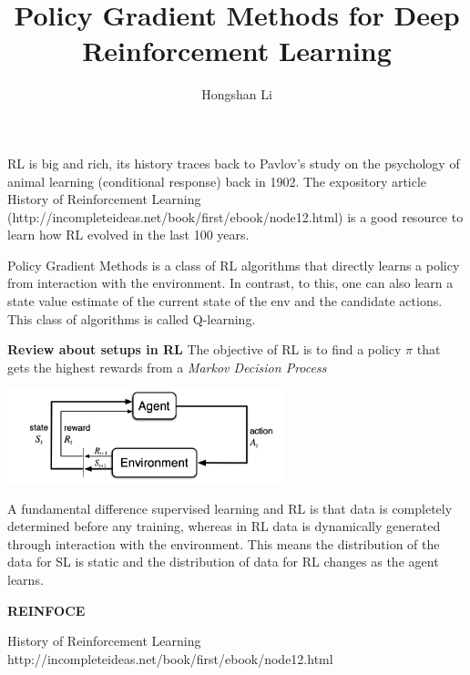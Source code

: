 \documentclass{article}
\title{Policy Gradient Methods for Deep Reinforcement Learning}
\author{Hongshan Li}
\begin{document}
\maketitle

RL is big and rich, its history traces back to Pavlov's study on the 
psychology of animal learning (conditional response) back in 1902.
The expository article History of Reinforcement Learning (http://incompleteideas.net/book/first/ebook/node12.html) is a good resource to learn
how RL evolved in the last 100 years.

Policy Gradient Methods is a class of RL algorithms that directly 
learns a policy from interaction with the environment. In contrast,
to this, one can also learn a state value estimate of the current
state of the env and the candidate actions. This class of algorithms
is called Q-learning. 


\textbf{Review about setups in RL}
The objective of RL is to find a policy $\pi$ that gets the highest 
rewards from a \emph{Markov Decision Process}

\includegraphics[width=8cm]{mdp}

A fundamental difference supervised learning and RL is that data is 
completely determined before any training, whereas in RL data is
dynamically generated through interaction with the environment. 
This means the distribution of the data for SL is static and the 
distribution of data for RL changes as the agent learns. 


\textbf{REINFOCE}



History of Reinforcement Learning
http://incompleteideas.net/book/first/ebook/node12.html
\end{document}
